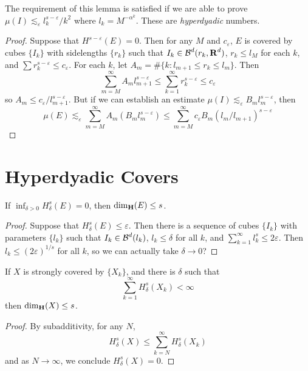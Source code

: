 The requirement of this lemma is satisfied if we are able to prove $\mu(I) \lesssim_\varepsilon l_k^{s - \varepsilon}/k^2$ where $l_k = M^{- \alpha^k}$. These are {\it hyperdyadic} numbers.

\begin{proof}
	Suppose that $H^{s-\varepsilon}(E) = 0$. Then for any $M$ and $c_\varepsilon$, $E$ is covered by cubes $\{ I_k \}$ with sidelengths $\{ r_k \}$ such that $I_k \in \operatorname{\mathcal{B}}^d(r_k,\operatorname{\mathbf{R}}^d)$, $r_k \leq l_M$ for each $k$, and $\sum r_k^{s - \varepsilon} \leq c_\varepsilon$. For each $k$, let $A_m = \# \{ k: l_{m+1} \leq r_k \leq l_m \}$. Then
	\[ \sum_{m = M}^\infty A_m l_{m+1}^{s - \varepsilon} \leq \sum_{k = 1}^\infty r_k^{s - \varepsilon} \leq c_\varepsilon \]
	so $A_m \leq c_\varepsilon / l_{m+1}^{s-\varepsilon}$. But if we can establish an estimate $\mu(I) \lesssim_\varepsilon B_m l_m^{s - \varepsilon}$, then 
	\[ \mu(E) \lesssim_\varepsilon \sum_{m = M}^\infty A_m (B_m l_m^{s - \varepsilon}) \leq \sum_{m = M}^\infty c_\varepsilon B_m (l_m/l_{m+1})^{s - \varepsilon} \]
\end{proof}

\section{Hyperdyadic Covers}

\begin{theorem}
	If $\inf_{\delta > 0} H^s_\delta(E) = 0$, then $\operatorname{\dim_{\mathbf{H}}}(E) \leq s$.
\end{theorem}
\begin{proof}
	Suppose that $H^s_\delta(E) \leq \varepsilon$. Then there is a sequence of cubes $\{ I_k \}$ with parameters $\{ l_k \}$ such that $I_k \in \operatorname{\mathcal{B}}^d(l_k)$, $l_k \leq \delta$ for all $k$, and $\sum_{k = 1}^\infty l_k^s \leq 2\varepsilon$. Then $l_k \leq (2\varepsilon)^{1/s}$ for all $k$, so we can actually take $\delta \to 0$?
\end{proof}

\begin{theorem}
	If $X$ is strongly covered by $\{ X_k \}$, and there is $\delta$ such that
	\[ \sum_{k = 1}^\infty H^s_\delta(X_k) < \infty \]
	then $\operatorname{\dim_{\mathbf{H}}}(X) \leq s$.
\end{theorem}
\begin{proof}
	By subadditivity, for any $N$,
	\[ H^s_\delta(X) \leq \sum_{k = N}^\infty H^s_\delta(X_k) \]
	and as $N \to \infty$, we conclude $H^s_\delta(X) = 0$.
\end{proof}

